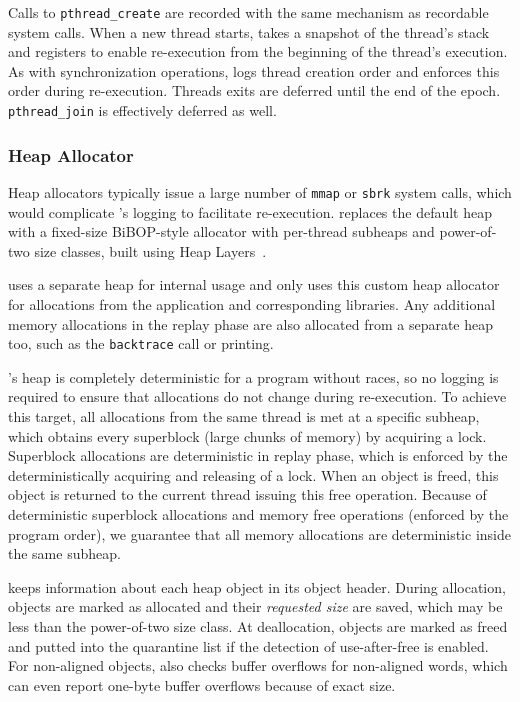 Calls to \texttt{pthread\_create} are recorded with the same mechanism as recordable system calls. When a new thread starts, \doubletake{} takes a snapshot of the thread's stack and registers to enable re-execution from the beginning of the thread's execution. As with synchronization operations, \doubletake{} logs thread creation order and enforces this order during re-execution.  Threads exits are deferred until the end of the epoch. \texttt{pthread\_join} is effectively deferred as well.


\subsubsection*{Heap Allocator}
\label{sec:heapallocator}

Heap allocators typically issue a large number of \texttt{mmap} or \texttt{sbrk} system calls, which would complicate \doubletake{}'s logging to facilitate re-execution. \doubletake{} replaces the default heap with a fixed-size BiBOP-style allocator with per-thread subheaps and power-of-two size classes, built using Heap Layers~\cite{heaplayers}. 


\doubletake{} uses a separate heap for internal usage and only uses this custom heap allocator for allocations from the application and corresponding libraries. Any additional memory allocations in the replay phase are also allocated from a separate heap too, such as the \texttt{backtrace} call or printing. 

\doubletake{}'s heap is completely deterministic for a program without races, so no logging is required to ensure that allocations do not change during re-execution. To achieve this target, all allocations from the same thread is met at a specific subheap, which obtains every superblock (large chunks of memory) by acquiring a lock. Superblock allocations are deterministic in replay phase, which is enforced by the deterministically acquiring and releasing of a lock. When an object is freed, this object is returned to the current thread issuing this free operation. Because of deterministic superblock allocations and memory free operations (enforced by the program order), we guarantee that all memory allocations are deterministic inside the same subheap. 
 
\doubletake{} keeps information about each heap object in its object header. During allocation, objects are marked as allocated and their \emph{requested size} are saved, which may be less than the power-of-two size class. At deallocation, objects are marked as freed and putted into the quarantine list if the detection of use-after-free is enabled. For non-aligned objects, \doubletake{} also checks buffer overflows for non-aligned words, which can even report one-byte buffer overflows because of exact size. 

